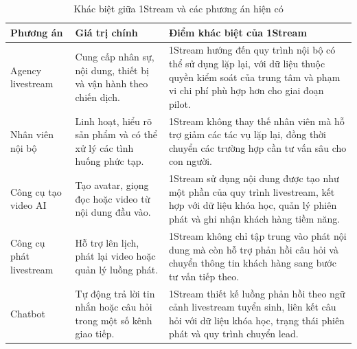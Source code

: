 \begin{table}[htbp]
    \centering
    \caption{Khác biệt giữa 1Stream và các phương án hiện có}
    \label{tab:positioning-alternatives}
    \begin{tabular}{
        p{}
        p{}
        p{}
    }
        \hline
        \textbf{Phương án}
        & \textbf{Giá trị chính}
        & \textbf{Điểm khác biệt của 1Stream} \\
        \hline

        Agency livestream
        &
        Cung cấp nhân sự, nội dung, thiết bị và vận hành theo chiến dịch.
        &
        1Stream hướng đến quy trình nội bộ có thể sử dụng lặp lại, với dữ liệu thuộc quyền kiểm soát của trung tâm và phạm vi chi phí phù hợp hơn cho giai đoạn pilot. \\

        \hline

        Nhân viên nội bộ
        &
        Linh hoạt, hiểu rõ sản phẩm và có thể xử lý các tình huống phức tạp.
        &
        1Stream không thay thế nhân viên mà hỗ trợ giảm các tác vụ lặp lại, đồng thời chuyển các trường hợp cần tư vấn sâu cho con người. \\

        \hline

        Công cụ tạo video AI
        &
        Tạo avatar, giọng đọc hoặc video từ nội dung đầu vào.
        &
        1Stream sử dụng nội dung được tạo như một phần của quy trình livestream, kết hợp với dữ liệu khóa học, quản lý phiên phát và ghi nhận khách hàng tiềm năng. \\

        \hline

        Công cụ phát livestream
        &
        Hỗ trợ lên lịch, phát lại video hoặc quản lý luồng phát.
        &
        1Stream không chỉ tập trung vào phát nội dung mà còn hỗ trợ phản hồi câu hỏi và chuyển thông tin khách hàng sang bước tư vấn tiếp theo. \\

        \hline

        Chatbot
        &
        Tự động trả lời tin nhắn hoặc câu hỏi trong một số kênh giao tiếp.
        &
        1Stream thiết kế luồng phản hồi theo ngữ cảnh livestream tuyển sinh, liên kết câu hỏi với dữ liệu khóa học, trạng thái phiên phát và quy trình chuyển lead. \\

        \hline
    \end{tabular}
\end{table}

